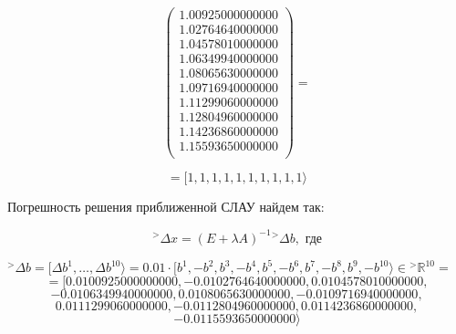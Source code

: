 \documentclass[a4paper, 12pt]{extarticle}
\begin{document}
\begin{equation*}
{        \begin{pmatrix}
            1.00925000000000\\ 
            1.02764640000000\\ 
            1.04578010000000\\ 
            1.06349940000000\\ 
            1.08065630000000\\ 
            1.09716940000000\\ 
            1.11299060000000\\ 
            1.12804960000000\\ 
            1.14236860000000\\ 
            1.15593650000000\\ 
        \end{pmatrix}
        =
    }
\end{equation*}

\begin{equation}
    = [ 1,1,1,1,1,1,1,1,1,1 \rangle
\end{equation}

Погрешность решения приближенной СЛАУ найдем так:

\begin{equation}
    {^> \Delta x} = (E + \lambda A)^{-1} {^> \Delta b}, \textrm{ где}
\end{equation}

$
    {^> \Delta b} = 
    [ \Delta b^1, \dots, \Delta b^{10} \rangle = 
    0.01 \cdot [ b^1, -b^2, b^3, -b^4, b^5, -b^6, b^7, -b^8, b^9, -b^{10} \rangle \in {^> \mathbb{R} ^{10}} = 
$ \\

\begin{equation*}
    = [ 
    0.0100925000000000,
    -0.0102764640000000,
    0.0104578010000000,
\end{equation*}
\vspace{-1\baselineskip}
\begin{equation*}
    -0.0106349940000000,
    0.0108065630000000,
    -0.0109716940000000,
\end{equation*}
\vspace{-1\baselineskip}
\begin{equation*}
    0.0111299060000000,
    -0.0112804960000000,
    0.0114236860000000,
\end{equation*}
\vspace{-1\baselineskip}
\begin{equation}
    -0.0115593650000000 
    \rangle
\end{equation}
\end{document}
